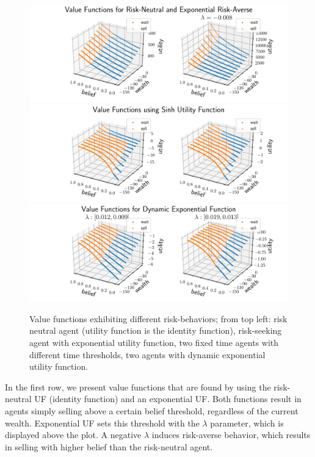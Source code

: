 \begin{figure}[h]
    \centering
    \includegraphics[width=0.99\linewidth]{img/exp_policy.pdf}\\
    \includegraphics[width=0.99\linewidth]{img/sinh_policy.pdf}\\
    \includegraphics[width=0.99\linewidth]{img/dyn_policy.pdf}
    \caption{Value functions exhibiting different risk-behaviors; from top left: risk neutral agent (utility function is the identity function), risk-seeking agent with exponential utility function, two fixed time agents with different time thresholds, two agents with dynamic exponential utility function.}\label{fig:val-func}
\end{figure}


In the first row, we present value functions that are found by using the risk-neutral UF (identity function) and an exponential UF. Both functions result in agents simply selling above a certain belief threshold, regardless of the current wealth.
Exponential UF sets this threshold with the $\lambda$ parameter, which is displayed above the plot.
A negative $\lambda$ induces risk-averse behavior, which results in selling with higher belief than the risk-neutral agent.

